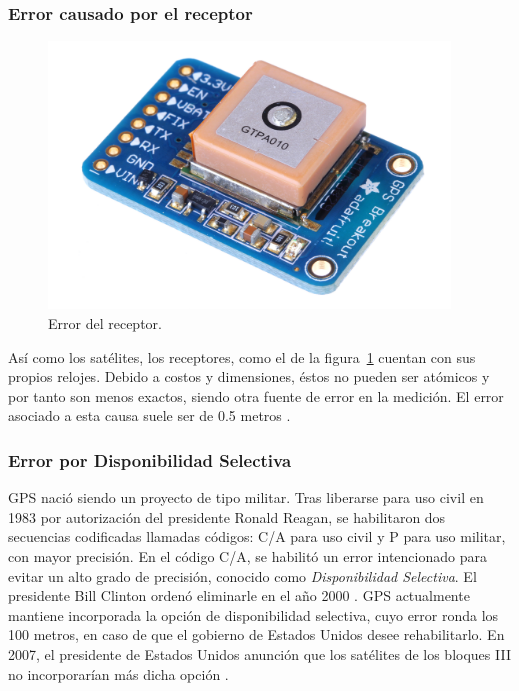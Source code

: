 \subsubsection{Error causado por el receptor}

\begin{figure}[H]
\centering
\includegraphics[width=0.95\textwidth]{Figures/disp}
\caption[Error del receptor.]{Error del receptor\footnotemark.}
\label{fig:ErrRec}
\end{figure}


Así como los satélites, los receptores, como el de la figura~\ref{fig:ErrRec} cuentan con sus propios relojes. Debido a costos y dimensiones, éstos no pueden ser atómicos y por tanto son menos exactos, siendo otra fuente de error en la medición. El error asociado a esta causa suele ser de 0.5 metros \citep{fallas2002sistema}.

\subsubsection{Error por Disponibilidad Selectiva}

GPS nació siendo un proyecto de tipo militar. Tras liberarse para uso civil en 1983 por autorización del presidente Ronald Reagan, se habilitaron dos secuencias codificadas llamadas códigos: C/A para uso civil y P para uso militar, con mayor precisión. En el código C/A, se habilitó un error intencionado para evitar un alto grado de precisión, conocido como \textit{Disponibilidad Selectiva}. El presidente Bill Clinton ordenó eliminarle en el año 2000 \citep{termal2014prototipo}. GPS actualmente mantiene incorporada la opción de disponibilidad selectiva, cuyo error ronda los 100 metros, en caso de que el gobierno de Estados Unidos desee rehabilitarlo. En 2007, el presidente de Estados Unidos anunción que los satélites de los bloques III no incorporarían más dicha opción \citep{chafer2017diseno}.

